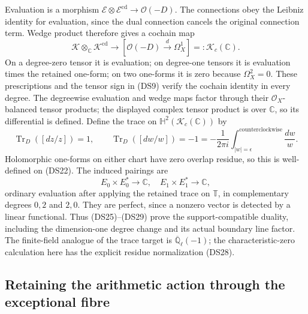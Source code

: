 \documentclass{article}
\begin{document}
Evaluation is a morphism
$\mathscr E\otimes\mathscr E^{\mathrm{cd}}\to\mathcal O(-D)$.
The connections obey the Leibniz identity for evaluation, since the
dual connection cancels the original connection term.  Wedge product
therefore gives a cochain map
\[
 \mathscr K\otimes_{\mathbb C}\mathscr K^{\mathrm{cd}}
 \longrightarrow [\mathcal O(-D)\xrightarrow d\Omega_X^1]
 =:\mathscr K_c(\mathbb C).
 \tag{DS27}
\]
On a degree-zero tensor it is evaluation; on degree-one tensors it
is evaluation times the retained one-form; on two one-forms it is
zero because $\Omega_X^2=0$.  These prescriptions and the tensor
sign in (DS9) verify the cochain identity in every degree.
The degreewise evaluation and wedge maps factor through their
$\mathcal O_X$-balanced tensor products; the displayed complex
tensor product is over $\mathbb C$, so its differential is defined.
Define the trace on $\mathbb H^2(\mathscr K_c(\mathbb C))$ by
\[
 \operatorname{Tr}_D([dz/z])=1,\qquad
 \operatorname{Tr}_D([dw/w])=-1
 =-\frac1{2\pi i}\int_{|w|=\epsilon}^{\mathrm{counterclockwise}}\frac{dw}{w}.
 \tag{DS28}
\]
Holomorphic one-forms on either chart have zero overlap residue, so
this is well-defined on (DS22).  The induced pairings are
\[
 E_0\times E_0^*\to\mathbb C,
 \quad E_1\times E_1^*\to\mathbb C,
 \tag{DS29}
\]
ordinary evaluation after applying the retained trace on $\mathbb T$,
in complementary degrees $0,2$ and $2,0$.
They are perfect, since a nonzero vector is detected by a linear
functional.  Thus (DS25)--(DS29) prove the support-compatible
duality, including the dimension-one degree change and its actual
boundary line factor.  The finite-field analogue of the trace target
is $\overline{\mathbb Q}_\ell(-1)$; the characteristic-zero calculation
here has the explicit residue normalization (DS28).

\subsection{Retaining the arithmetic action through the exceptional fibre}
\end{document}
